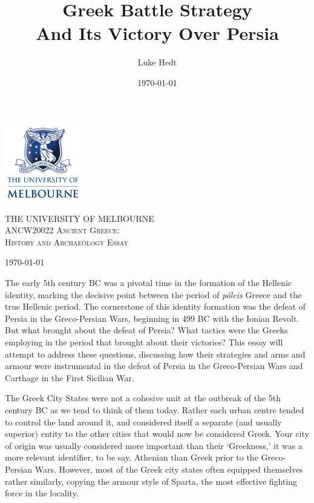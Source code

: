 \documentclass[a4paper, 12pt]{article}
\title{Greek Battle Strategy \\ And Its Victory Over Persia}
\author{Luke Hedt}
\date{\today}
\begin{document}
\begin{titlepage}
    \centering
    \includegraphics[width=0.25\textwidth]{UniLogo.png}\par\vspace{1cm}
    {\scshape\Large THE UNIVERSITY OF MELBOURNE \\
              \large ANCW20022 Ancient Greece: \\
              History and Archaeology Essay\par}
    \vspace{1.5cm}
    {\Huge \thetitle \par}
    \vfill

    {\Large\itshape \theauthor \par}
    \vspace{1.5cm}
    {\Large \today\par}
\end{titlepage}
\pagestyle{plain}

The early 5th century BC was a pivotal time in the formation of the Hellenic
identity, marking the decisive point between the period of \emph{p{\'o}leis} Greece
and the true Hellenic period. The cornerstone of this identity formation
was the defeat of Persia in the Greco-Persian Wars, beginning in 499 BC
with the Ionian Revolt. But what brought about the defeat of Persia? What tactics
were the Greeks employing in the period that brought about their victories?
This essay will attempt to address these questions, discussing how their
strategies and arms and armour were instrumental in the defeat of Persia
in the Greco-Persian Wars and
Carthage in the First Sicilian War.

\vspace{1em} \par

The Greek City States were not a cohesive unit at the outbreak of the 5th century
BC as we tend to think of them today. Rather each urban centre tended to control
the land around it, and considered itself a separate (and usually superior)
entity to the other cities that would now be considered Greek. Your city of
origin was usually considered more important than their `Greekness,' it was
a more relevant identifier, to be say, Athenian than Greek prior to the
Greco-Persian Wars. However, most of the Greek city states often equipped
themselves rather similarly, copying the armour style of Sparta, the most
effective fighting force in the locality.


\nocite{*}
\newpage
\printbibliography
\end{document}
